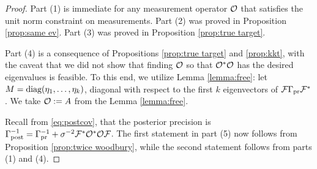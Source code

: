\char*

\begin{proof}
  Part (1) is immediate for any measurement operator $\mathcal{O}$ that
  satisfies the unit norm constraint on measurements. Part (2)
  was proved in Proposition \ref{prop:same ev}. Part (3) was proved in
  Proposition \ref{prop:true target}.
  
  Part (4) is a consequence of Propositions \ref{prop:true target} and
  \ref{prop:kkt}, with the caveat that we did not show that finding
  $\mathcal{O}$ so that $\mathcal{O}^*\mathcal{O}$ has the desired eigenvalues is
  feasible. To this end, we utilize Lemma \ref{lemma:free}: let $M =
  \textup{diag}(\eta_1, \dots, \eta_k)$, diagonal with respect to the first $k$
  eigenvectors of $\mathcal{F} \Gamma_{\textup{pr}} \mathcal{F}^*$. We take $\mathcal{O} := A$ from the
  Lemma \ref{lemma:free}.
  
  Recall from \eqref{eq:postcov}, that the posterior precision is
  $\Gamma_{\textup{post}}^{-1} = \Gamma_{\textup{pr}}^{-1} + \sigma^{-2}\mathcal{F}^*\mathcal{O}^*\mathcal{O}\mathcal{F}$. The
  first statement in part (5) now follows from Proposition
  \ref{prop:twice woodbury}, while the second statement follows from
  parts (1) and (4).
\end{proof}


\optimalvsnot

